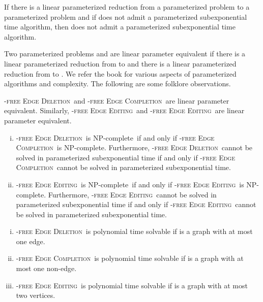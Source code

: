 \documentclass[envcountsame,envcountsect,10pt,oribibl]{llncs}
\newcommand{\pname}[1]{\textnormal{\textsc{#1}}}
\newcommand{\cclass}[1]{\textnormal{\textsf{#1}}}
\newcommand{\HED}{\pname{-free Edge Deletion}}
\newcommand{\HEC}{\pname{-free Edge Completion}}
\newcommand{\HEE}{\pname{-free Edge Editing}}
\newcommand{\HBEC}{\pname{-free Edge Completion}}
\newcommand{\HBEE}{\pname{-free Edge Editing}}
\newcommand{\NPC}{\cclass{NP-complete}}
\begin{document}
\begin{proposition}
  \label{pro:lpr}
  If there is a linear parameterized reduction from a parameterized problem 
  to a parameterized problem  and if  does not admit a parameterized subexponential
  time algorithm, then  does not admit a parameterized subexponential time algorithm.
\end{proposition}

Two parameterized problems  and  are linear parameter equivalent if there is a linear 
parameterized reduction from  to  and there is a linear parameterized reduction from 
 to . We refer the book \cite{DBLP:books/sp/CyganFKLMPPS15} for various aspects of 
parameterized algorithms and complexity.
The following are some folklore observations.

\begin{proposition}
  \label{pro:folklore}
  \HED\ and \HBEC\ are linear parameter equivalent. Similarly,
  \HEE\ and \HBEE\ are linear parameter equivalent.
\end{proposition}

\begin{proposition}
  \label{pro:equivalence}
  \begin{enumerate}[(i)]
  \item\label{item:dc-equivalence} \HED\ is \NPC\ if and only if \HBEC\ is \NPC.
    Furthermore, \HED\ cannot be solved in parameterized subexponential time
    if and only if \HBEC\ cannot be solved in parameterized subexponential time.
  \item\label{item:ee-equivalence} \HEE\ is \NPC\ if and only if \HBEE\ is \NPC.
    Furthermore, \HEE\ cannot be solved in parameterized subexponential time
    if and only if \HBEE\ cannot be solved in parameterized subexponential time.
  \end{enumerate}
\end{proposition}

\begin{proposition}
  \label{pro:polynomial}
  \begin{enumerate}[(i)]
  \item\label{item:poly-deletion} \HED\ is polynomial time solvable if  is a graph with
    at most one edge.
  \item\label{item:poly-completion} \HEC\ is polynomial time solvable if  is a graph with
    at most one non-edge.
  \item\label{item:poly-editing} \HEE\ is polynomial time solvable if  is a graph with
  at most two vertices.
  \end{enumerate}
\end{proposition}
\end{document}
